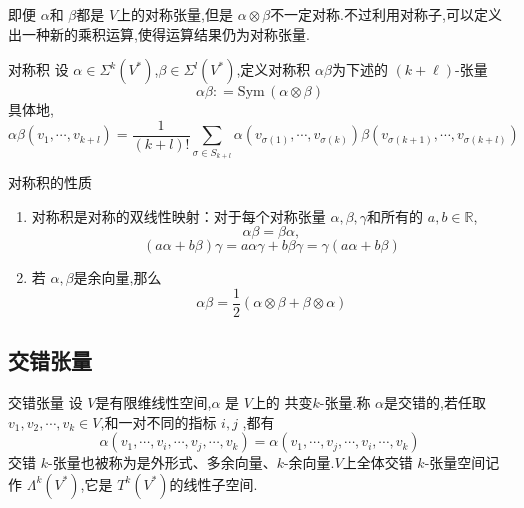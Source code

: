 \documentclass[../../几何与拓扑.tex]{subfiles}
\begin{document}
即便 $ \alpha $和 $ \beta $都是 $ V $上的对称张量,但是 $ \alpha\otimes \beta $不一定对称.不过利用对称子,可以定义出一种新的乘积运算,使得运算结果仍为对称张量.

\begin{definition}{对称积}
    设 $ \alpha \in \Sigma^{k}\left( V^{*} \right)  $,$ \beta \in  \Sigma^{l}\left( V^{*} \right)  $,定义对称积 $ \alpha \beta $为下述的 $ \left( k+ \ell \right)  $-张量 $$
    \alpha \beta : = \mathrm{Sym}\,\left( \alpha \otimes \beta \right) 
    $$具体地, $$
    \alpha \beta\left( v_1,\cdots ,v_{k+ l} \right)= \frac{1}{\left( k+ l \right)! } \sum_{\sigma \in S_{k+ l}}  \alpha\left( v_{\sigma\left( 1 \right) },\cdots ,v_{\sigma\left( k \right) } \right)\beta\left( v_{\sigma\left( k+ 1 \right) },\cdots ,v_{\sigma\left( k+ l \right) } \right)  
    $$    
\end{definition}

\begin{proposition}{对称积的性质}
    \begin{enumerate}
        \item 对称积是对称的双线性映射：对于每个对称张量 $ \alpha,\beta,\gamma $和所有的 $ a,b \in \mathbb{R}  $, $$
        \alpha \beta = \beta \alpha,
        $$ $$
        \left( a\alpha+ b\beta \right)\gamma= a\alpha\gamma+ b\beta \gamma =  \gamma \left( a \alpha+  b\beta \right)  
        $$  
        \item 若 $ \alpha,\beta $是余向量,那么 $$
        \alpha\beta= \frac{1}{2} \left( \alpha \otimes  \beta +  \beta \otimes \alpha \right) 
        $$ 
    \end{enumerate}
    
    
\end{proposition}

\subsection{交错张量}
\begin{definition}{交错张量}
    设 $ V $是有限维线性空间,$ \alpha $  是 $ V $上的 共变$ k $-张量.称 $ \alpha $是交错的,若任取 $ v_1,v_2,\cdots,v_k\in V $,和一对不同的指标 $ i,j $     ,都有 $$
    \alpha\left(v_1,\cdots ,v_{i},\cdots ,v_{j},\cdots ,v_{k}  \right)= \alpha\left( v_1,\cdots ,v_{j},\cdots ,v_{i},\cdots ,v_{k} \right)  
    $$ 交错 $ k $-张量也被称为是外形式、多余向量、$ k $-余向量.$ V $上全体交错 $ k $-张量空间记作 $ \Lambda^{k}\left( V^{*} \right)  $,它是 $ T^{k}\left( V^{*} \right)     $的线性子空间.       
\end{definition}
\end{document}
